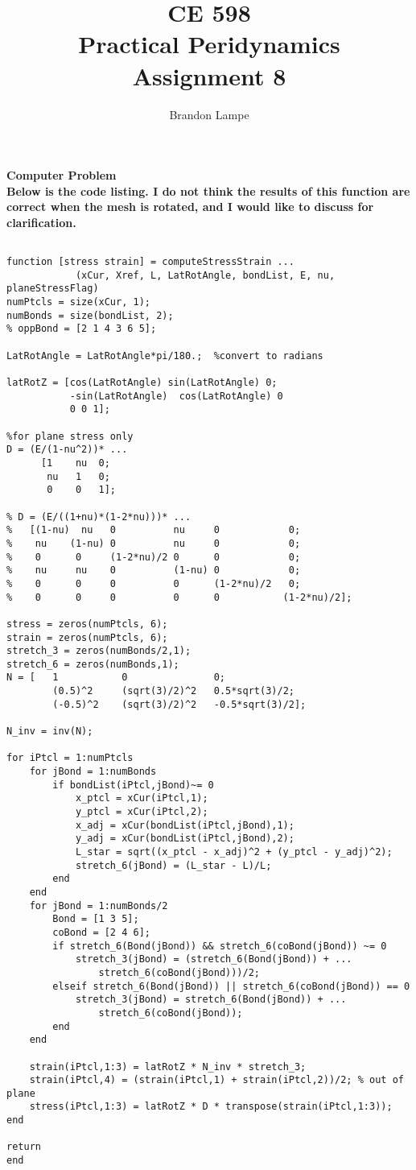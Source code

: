 \documentclass[letterpaper, 10pt, oneside]{article}
\title{CE 598\\ Practical Peridynamics\\ Assignment 8}
\author{Brandon Lampe}
\begin{document}
\maketitle

\bf{Computer Problem}\\

Below is the code listing.  I do not think the results of this function are correct when the mesh is rotated, and I would like to discuss for clarification.\\

\begin{lstlisting}

function [stress strain] = computeStressStrain ...
            (xCur, Xref, L, LatRotAngle, bondList, E, nu, planeStressFlag)
numPtcls = size(xCur, 1);
numBonds = size(bondList, 2);
% oppBond = [2 1 4 3 6 5];

LatRotAngle = LatRotAngle*pi/180.;  %convert to radians

latRotZ = [cos(LatRotAngle) sin(LatRotAngle) 0;
           -sin(LatRotAngle)  cos(LatRotAngle) 0
           0 0 1];

%for plane stress only
D = (E/(1-nu^2))* ...
      [1    nu  0;
       nu   1   0;
       0    0   1];

% D = (E/((1+nu)*(1-2*nu)))* ...
%   [(1-nu)  nu   0          nu     0            0;
%    nu    (1-nu) 0          nu     0            0;
%    0      0     (1-2*nu)/2 0      0            0;
%    nu     nu    0          (1-nu) 0            0;
%    0      0     0          0      (1-2*nu)/2   0;
%    0      0     0          0      0           (1-2*nu)/2];
   
stress = zeros(numPtcls, 6);
strain = zeros(numPtcls, 6);
stretch_3 = zeros(numBonds/2,1);
stretch_6 = zeros(numBonds,1);
N = [   1           0               0;
        (0.5)^2     (sqrt(3)/2)^2   0.5*sqrt(3)/2;
        (-0.5)^2    (sqrt(3)/2)^2   -0.5*sqrt(3)/2];
    
N_inv = inv(N);

for iPtcl = 1:numPtcls
    for jBond = 1:numBonds
        if bondList(iPtcl,jBond)~= 0
            x_ptcl = xCur(iPtcl,1);
            y_ptcl = xCur(iPtcl,2);
            x_adj = xCur(bondList(iPtcl,jBond),1);
            y_adj = xCur(bondList(iPtcl,jBond),2);
            L_star = sqrt((x_ptcl - x_adj)^2 + (y_ptcl - y_adj)^2);
            stretch_6(jBond) = (L_star - L)/L;
        end
    end
    for jBond = 1:numBonds/2
        Bond = [1 3 5];
        coBond = [2 4 6];
        if stretch_6(Bond(jBond)) && stretch_6(coBond(jBond)) ~= 0
            stretch_3(jBond) = (stretch_6(Bond(jBond)) + ...
                stretch_6(coBond(jBond)))/2;
        elseif stretch_6(Bond(jBond)) || stretch_6(coBond(jBond)) == 0
            stretch_3(jBond) = stretch_6(Bond(jBond)) + ...
                stretch_6(coBond(jBond));
        end
    end

    strain(iPtcl,1:3) = latRotZ * N_inv * stretch_3;
    strain(iPtcl,4) = (strain(iPtcl,1) + strain(iPtcl,2))/2; % out of plane
    stress(iPtcl,1:3) = latRotZ * D * transpose(strain(iPtcl,1:3));
end

return
end
\end{lstlisting}
\end{document}
